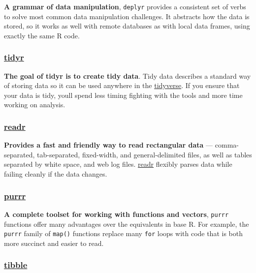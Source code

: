\documentclass[]{book}
\theoremstyle{definition}
\theoremstyle{definition}
\theoremstyle{definition}
\theoremstyle{remark}
\begin{document}
\textbf{A grammar of data manipulation}, \texttt{deplyr} provides a
consistent set of verbs to solve most common data manipulation
challenges. It abstracts how the data is stored, so it works as well
with remote databases as with local data frames, using exactly the same
R code.

\hypertarget{tidyr}{%
\subsubsection{\texorpdfstring{\href{http://tidyr.tidyverse.org/}{tidyr}}{tidyr}}\label{tidyr}}

\textbf{The goal of tidyr is to create tidy data}. Tidy data describes a
standard way of storing data so it can be used anywhere in the
\href{https://www.tidyverse.org/}{tidyverse}. If you ensure that your
data is tidy, youll spend less timing fighting with the tools and more
time working on analysis.

\hypertarget{readr}{%
\subsubsection{\texorpdfstring{\href{http://readr.tidyverse.org/}{readr}}{readr}}\label{readr}}

\textbf{Provides a fast and friendly way to read rectangular data} ---
comma-separated, tab-separated, fixed-width, and general-delimited
files, as well as tables separated by white space, and web log files.
\href{http://readr.tidyverse.org/}{readr} flexibly parses data while
failing cleanly if the data changes.

\hypertarget{purrr}{%
\subsubsection{\texorpdfstring{\href{http://purrr.tidyverse.org/}{purrr}}{purrr}}\label{purrr}}

\textbf{A complete toolset for working with functions and vectors},
\texttt{purrr} functions offer many advantages over the equivalents in
base R. For example, the \texttt{purrr} family of \texttt{map()}
functions replace many \texttt{for} loops with code that is both more
succinct and easier to read.

\hypertarget{tibble}{%
\subsubsection{\texorpdfstring{\href{http://tibble.tidyverse.org/}{tibble}}{tibble}}\label{tibble}}
\end{document}
